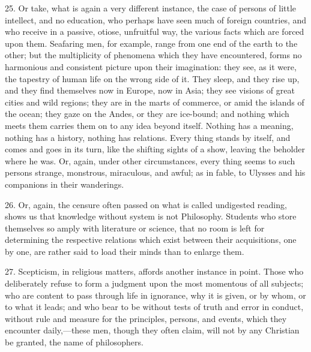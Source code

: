 25. Or take, what is again a very different instance, the case of
persons of little intellect, and no education, who perhaps have seen
much of foreign countries, and who receive in a passive, otiose,
unfruitful way, the various facts which are forced upon them.
Seafaring men, for example, range from one end of the earth to the
other; but the multiplicity of phenomena which they have encountered,
forms no harmonious and consistent picture upon their imagination:
they see, as it were, the tapestry of human life on the wrong side of
it. They sleep, and they rise up, and they find themselves now in
Europe, now in Asia; they see visions of great cities and wild
regions; they are in the marts of commerce, or amid the islands of the
ocean; they gaze on the Andes, or they are ice-bound; and nothing
which meets them carries them on to any idea beyond itself. Nothing
has a meaning, nothing has a history, nothing has relations. Every
thing stands by itself, and comes and goes in its turn, like the
shifting sights of a show, leaving the beholder where he was. Or,
again, under other circumstances, every thing seems to such persons
strange, monstrous, miraculous, and awful; as in fable, to Ulysses and
his companions in their wanderings.

26. Or, again, the censure often passed on what is called
undigested reading, shows us that knowledge without system is not
Philosophy. Students who store themselves so amply with literature or
science, that no room is left for determining the respective relations
which exist between their acquisitions, one by one, are rather said to
load their minds than to enlarge them.

27. Scepticism, in religious matters, affords another instance in
point. Those who deliberately refuse to form a judgment upon the most
momentous of all subjects; who are content to pass through life in
ignorance, why it is given, or by whom, or to what it leads; and who
bear to be without tests of truth and error in conduct, without rule
and measure for the principles, persons, and events, which they
encounter daily,—these men, though they often claim, will not by any
Christian be granted, the name of philosophers.


